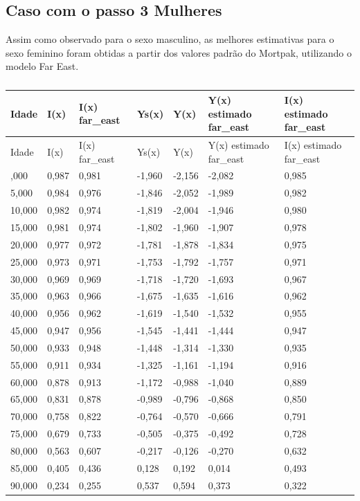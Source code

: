\documentclass[
  12pt,
  a4paper,
]{scrreprt}
\begin{document}
\subsection{Caso com o passo 3
Mulheres}\label{caso-com-o-passo-3-mulheres}

Assim como observado para o sexo masculino, as melhores estimativas para
o sexo feminino foram obtidas a partir dos valores padrão do Mortpak,
utilizando o modelo Far East.

\begin{longtable}[]{@{}lllllll@{}}
\caption{}\label{T_af524}\tabularnewline
\toprule\noalign{}
Idade & I(x) & I(x) far\_east & Ys(x) & Y(x) & Y(x) estimado far\_east &
I(x) estimado far\_east \\
\midrule\noalign{}
\endfirsthead
\toprule\noalign{}
Idade & I(x) & I(x) far\_east & Ys(x) & Y(x) & Y(x) estimado far\_east &
I(x) estimado far\_east \\
\midrule\noalign{}
\endhead
\bottomrule\noalign{}
\endlastfoot
1,000 & 0,987 & 0,981 & -1,960 & -2,156 & -2,082 & 0,985 \\
5,000 & 0,984 & 0,976 & -1,846 & -2,052 & -1,989 & 0,982 \\
10,000 & 0,982 & 0,974 & -1,819 & -2,004 & -1,946 & 0,980 \\
15,000 & 0,981 & 0,974 & -1,802 & -1,960 & -1,907 & 0,978 \\
20,000 & 0,977 & 0,972 & -1,781 & -1,878 & -1,834 & 0,975 \\
25,000 & 0,973 & 0,971 & -1,753 & -1,792 & -1,757 & 0,971 \\
30,000 & 0,969 & 0,969 & -1,718 & -1,720 & -1,693 & 0,967 \\
35,000 & 0,963 & 0,966 & -1,675 & -1,635 & -1,616 & 0,962 \\
40,000 & 0,956 & 0,962 & -1,619 & -1,540 & -1,532 & 0,955 \\
45,000 & 0,947 & 0,956 & -1,545 & -1,441 & -1,444 & 0,947 \\
50,000 & 0,933 & 0,948 & -1,448 & -1,314 & -1,330 & 0,935 \\
55,000 & 0,911 & 0,934 & -1,325 & -1,161 & -1,194 & 0,916 \\
60,000 & 0,878 & 0,913 & -1,172 & -0,988 & -1,040 & 0,889 \\
65,000 & 0,831 & 0,878 & -0,989 & -0,796 & -0,868 & 0,850 \\
70,000 & 0,758 & 0,822 & -0,764 & -0,570 & -0,666 & 0,791 \\
75,000 & 0,679 & 0,733 & -0,505 & -0,375 & -0,492 & 0,728 \\
80,000 & 0,563 & 0,607 & -0,217 & -0,126 & -0,270 & 0,632 \\
85,000 & 0,405 & 0,436 & 0,128 & 0,192 & 0,014 & 0,493 \\
90,000 & 0,234 & 0,255 & 0,537 & 0,594 & 0,373 & 0,322 \\
\end{longtable}
\end{document}
